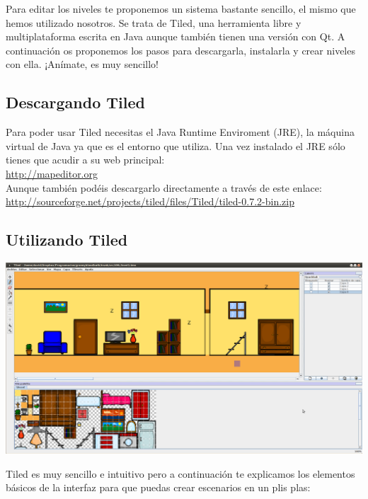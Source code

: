 Para editar los niveles te proponemos un sistema bastante sencillo, el
mismo que hemos utilizado nosotros. Se trata de Tiled, una herramienta libre
y multiplataforma escrita en Java aunque también tienen una versión con Qt.
A continuación os proponemos los pasos para descargarla, instalarla y crear
niveles con ella. ¡Anímate, es muy sencillo!

\subsection{Descargando Tiled}
Para poder usar Tiled necesitas el Java Runtime Enviroment (JRE), la máquina
virtual de Java ya que es el entorno que utiliza. Una vez instalado el JRE
sólo tienes que acudir a su web principal:\\

\href{http://mapeditor.org}{http://mapeditor.org}\\

Aunque también podéis descargarlo directamente a través de este enlace:\\

\href{http://sourceforge.net/projects/tiled/files/Tiled/tiled-0.7.2-bin.zip}{http://sourceforge.net/projects/tiled/files/Tiled/tiled-0.7.2-bin.zip}

\subsection{Utilizando Tiled}

\begin{center}
\includegraphics[scale=0.18]{tiled01.png}
\end{center}

Tiled es muy sencillo e intuitivo pero a continuación te explicamos los
elementos básicos de la interfaz para que puedas crear escenarios en un
plis plas:

